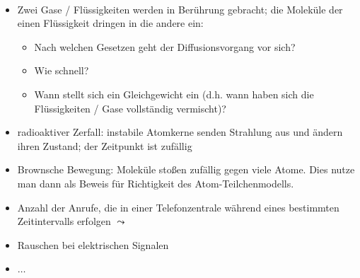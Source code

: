 \begin{beisp}\
	\begin{itemize}
		\item Zwei Gase / Flüssigkeiten werden in Berührung gebracht; die Moleküle der einen Flüssigkeit dringen in die andere ein: \\
		\betone{Fragen:}
		\begin{itemize}
			\item Nach welchen Gesetzen geht der Diffusionsvorgang vor sich?
			\item Wie schnell?
			\item Wann stellt sich ein Gleichgewicht ein (d.h. wann haben sich die Flüssigkeiten / Gase vollständig vermischt)?
		\end{itemize}
		\item radioaktiver Zerfall: instabile Atomkerne senden Strahlung aus und ändern ihren Zustand; der Zeitpunkt ist zufällig
		\item Brownsche Bewegung: Moleküle stoßen zufällig gegen viele Atome. 
		Dies nutze man dann als Beweis für Richtigkeit des Atom-Teilchenmodells.
		\item Anzahl der Anrufe, die in einer Telefonzentrale während eines bestimmten Zeitintervalls erfolgen $\leadsto$ 
		\item Rauschen bei elektrischen Signalen
		\item $\ldots$
	\end{itemize}
\end{beisp}

